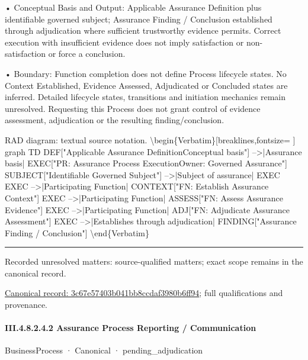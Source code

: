 •
Conceptual Basis and Output: Applicable Assurance Definition plus identifiable governed subject; Assurance Finding / Conclusion established through adjudication where sufficient trustworthy evidence permits. Correct execution with insufficient evidence does not imply satisfaction or non-satisfaction or force a conclusion.



•
Boundary: Function completion does not define Process lifecycle states. No Context Established, Evidence Assessed, Adjudicated or Concluded states are inferred. Detailed lifecycle states, transitions and initiation mechanics remain unresolved. Requesting this Process does not grant control of evidence assessment, adjudication or the resulting finding/conclusion.



RAD diagram: textual source notation.
\textbackslash{}begin\{Verbatim\}[breaklines,fontsize=
]
graph TD
    DEF["Applicable Assurance Definition\newline{}Conceptual basis"] -->|Assurance basis| EXEC["PR: Assurance Process Execution\newline{}Owner: Governed Assurance"]
    SUBJECT["Identifiable Governed Subject"] -->|Subject of assurance| EXEC
    EXEC -->|Participating Function| CONTEXT["FN: Establish Assurance Context"]
    EXEC -->|Participating Function| ASSESS["FN: Assess Assurance Evidence"]
    EXEC -->|Participating Function| ADJ["FN: Adjudicate Assurance Assessment"]
    EXEC -->|Establishes through adjudication| FINDING["Assurance Finding / Conclusion"]
\textbackslash{}end\{Verbatim\}



\medskip\hrule\medskip

{\small Recorded unresolved matters: source-qualified matters; exact scope remains in the canonical record.}\par
{\footnotesize \href{../../../../continuum/business/business-process/3c67e57403b041bb8ccdaf3980b6ff94.md}{Canonical record: 3c67e57403b041bb8ccdaf3980b6ff94}; full qualifications and provenance.}\par
\paragraph*{III.4.8.2.4.2 Assurance Process Reporting / Communication}
\label{navigation:III.4.8.2.4.2}

\label{element:2fc0b626577b43feb050bcd91ac2b0a9}
{\small BusinessProcess · Canonical · pending\_adjudication}\par

